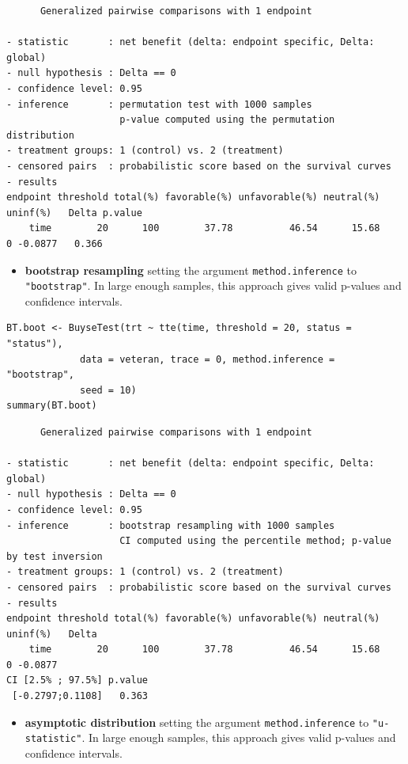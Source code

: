 \documentclass[12pt]{article}
\begin{document}
\begin{verbatim}
      Generalized pairwise comparisons with 1 endpoint

- statistic       : net benefit (delta: endpoint specific, Delta: global) 
- null hypothesis : Delta == 0 
- confidence level: 0.95 
- inference       : permutation test with 1000 samples 
                    p-value computed using the permutation distribution 
- treatment groups: 1 (control) vs. 2 (treatment) 
- censored pairs  : probabilistic score based on the survival curves
- results
endpoint threshold total(%) favorable(%) unfavorable(%) neutral(%) uninf(%)   Delta p.value 
    time        20      100        37.78          46.54      15.68        0 -0.0877   0.366
\end{verbatim}

\begin{itemize}
\item \textbf{bootstrap resampling} setting the argument \texttt{method.inference} to
\texttt{"bootstrap"}. In large enough samples, this approach gives valid
p-values and confidence intervals.
\end{itemize}

\lstset{language=r,label= ,caption= ,captionpos=b,numbers=none}
\begin{lstlisting}
BT.boot <- BuyseTest(trt ~ tte(time, threshold = 20, status = "status"),
		     data = veteran, trace = 0, method.inference = "bootstrap",
		     seed = 10) 
summary(BT.boot)
\end{lstlisting}

\begin{verbatim}
      Generalized pairwise comparisons with 1 endpoint

- statistic       : net benefit (delta: endpoint specific, Delta: global) 
- null hypothesis : Delta == 0 
- confidence level: 0.95 
- inference       : bootstrap resampling with 1000 samples 
                    CI computed using the percentile method; p-value by test inversion 
- treatment groups: 1 (control) vs. 2 (treatment) 
- censored pairs  : probabilistic score based on the survival curves
- results
endpoint threshold total(%) favorable(%) unfavorable(%) neutral(%) uninf(%)   Delta
    time        20      100        37.78          46.54      15.68        0 -0.0877
CI [2.5% ; 97.5%] p.value 
 [-0.2797;0.1108]   0.363
\end{verbatim}

\begin{itemize}
\item \textbf{asymptotic distribution} setting the argument \texttt{method.inference} to
\texttt{"u-statistic"}. In large enough samples, this approach gives valid
p-values and confidence intervals.
\end{itemize}
\end{document}
